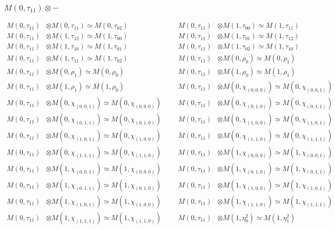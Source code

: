 \subsubsection{$ M(0,\tau_{11})\otimes -$}
\begin{align*}
M(0,\tau_{11}) &\otimes M(0,\tau_{11}) \simeq M(0,\tau_{02}) &&& M(0,\tau_{11}) &\otimes M(1,\tau_{00}) \simeq M(1,\tau_{11})\\
M(0,\tau_{11}) &\otimes M(1,\tau_{12}) \simeq M(1,\tau_{00}) &&& M(0,\tau_{11}) &\otimes M(1,\tau_{01}) \simeq M(1,\tau_{12})\\
M(0,\tau_{11}) &\otimes M(1,\tau_{10}) \simeq M(1,\tau_{01}) &&& M(0,\tau_{11}) &\otimes M(1,\tau_{02}) \simeq M(1,\tau_{10})\\
M(0,\tau_{11}) &\otimes M(1,\tau_{11}) \simeq M(1,\tau_{02}) &&& M(0,\tau_{11}) &\otimes M(0,\rho_{0}) \simeq M(0,\rho_{1})\\
M(0,\tau_{11}) &\otimes M(0,\rho_{1}) \simeq M(0,\rho_{0}) &&& M(0,\tau_{11}) &\otimes M(1,\rho_{0}) \simeq M(1,\rho_{1})\\
M(0,\tau_{11}) &\otimes M(1,\rho_{1}) \simeq M(1,\rho_{0}) &&& M(0,\tau_{11}) &\otimes M(0,\chi_{(0,0,0)}) \simeq M(0,\chi_{(0,0,1)})\\
M(0,\tau_{11}) &\otimes M(0,\chi_{(0,0,1)}) \simeq M(0,\chi_{(0,0,0)}) &&& M(0,\tau_{11}) &\otimes M(0,\chi_{(0,1,0)}) \simeq M(0,\chi_{(0,1,1)})\\
M(0,\tau_{11}) &\otimes M(0,\chi_{(0,1,1)}) \simeq M(0,\chi_{(0,1,0)}) &&& M(0,\tau_{11}) &\otimes M(0,\chi_{(1,0,0)}) \simeq M(0,\chi_{(1,0,1)})\\
M(0,\tau_{11}) &\otimes M(0,\chi_{(1,0,1)}) \simeq M(0,\chi_{(1,0,0)}) &&& M(0,\tau_{11}) &\otimes M(0,\chi_{(1,1,0)}) \simeq M(0,\chi_{(1,1,1)})\\
M(0,\tau_{11}) &\otimes M(0,\chi_{(1,1,1)}) \simeq M(0,\chi_{(1,1,0)}) &&& M(0,\tau_{11}) &\otimes M(1,\chi_{(0,0,0)}) \simeq M(1,\chi_{(0,0,1)})\\
M(0,\tau_{11}) &\otimes M(1,\chi_{(0,0,1)}) \simeq M(1,\chi_{(0,0,0)}) &&& M(0,\tau_{11}) &\otimes M(1,\chi_{(0,1,0)}) \simeq M(1,\chi_{(0,1,1)})\\
M(0,\tau_{11}) &\otimes M(1,\chi_{(0,1,1)}) \simeq M(1,\chi_{(0,1,0)}) &&& M(0,\tau_{11}) &\otimes M(1,\chi_{(1,0,0)}) \simeq M(1,\chi_{(1,0,1)})\\
M(0,\tau_{11}) &\otimes M(1,\chi_{(1,0,1)}) \simeq M(1,\chi_{(1,0,0)}) &&& M(0,\tau_{11}) &\otimes M(1,\chi_{(1,1,0)}) \simeq M(1,\chi_{(1,1,1)})\\
M(0,\tau_{11}) &\otimes M(1,\chi_{(1,1,1)}) \simeq M(1,\chi_{(1,1,0)}) &&& M(0,\tau_{11}) &\otimes M(1,\eta^{2}_{0}) \simeq M(1,\eta^{2}_{1})\\

\end{align*}
